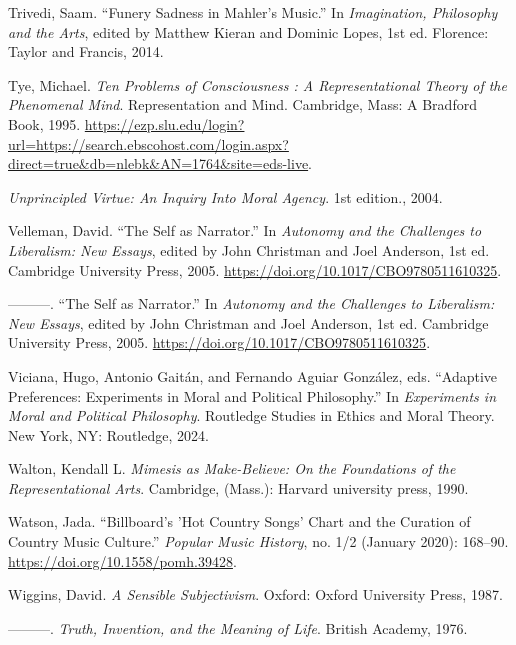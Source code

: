 \documentclass[
  12pt,
]{book}
\newlength{\cslhangindent}
\newenvironment{CSLReferences}[2] %
 {\begin{list}{}{%
  \setlength{\itemindent}{0pt}
  \setlength{\leftmargin}{0pt}
  \setlength{\parsep}{0pt}
  \ifodd #1
   \setlength{\leftmargin}{\cslhangindent}
   \setlength{\itemindent}{-1\cslhangindent}
  \fi
  \setlength{\itemsep}{#2\baselineskip}}}
 {\end{list}}
\theoremstyle{definition}
\theoremstyle{definition}
\theoremstyle{definition}
\theoremstyle{definition}
\theoremstyle{remark}
\begin{document}
\begin{CSLReferences}{1}{0}
Trivedi, Saam. {``Funery {Sadness} in {Mahler}'s {Music}.''} In \emph{Imagination, {Philosophy} and the {Arts}}, edited by Matthew Kieran and Dominic Lopes, 1st ed. Florence: {Taylor and Francis}, 2014.

Tye, Michael. \emph{Ten {Problems} of {Consciousness} : {A Representational Theory} of the {Phenomenal Mind}}. Representation and {Mind}. Cambridge, Mass: A Bradford Book, 1995. \url{https://ezp.slu.edu/login?url=https://search.ebscohost.com/login.aspx?direct=true&db=nlebk&AN=1764&site=eds-live}.

\emph{Unprincipled {Virtue}: {An Inquiry Into Moral Agency}}. 1st edition., 2004.

Velleman, David. {``The {Self} as {Narrator}.''} In \emph{Autonomy and the {Challenges} to {Liberalism}: {New Essays}}, edited by John Christman and Joel Anderson, 1st ed. Cambridge University Press, 2005. \url{https://doi.org/10.1017/CBO9780511610325}.

---------. {``The {Self} as {Narrator}.''} In \emph{Autonomy and the {Challenges} to {Liberalism}: {New Essays}}, edited by John Christman and Joel Anderson, 1st ed. Cambridge University Press, 2005. \url{https://doi.org/10.1017/CBO9780511610325}.

Viciana, Hugo, Antonio Gaitán, and Fernando Aguiar González, eds. {``Adaptive {Preferences}: {Experiments} in {Moral} and {Political Philosophy}.''} In \emph{Experiments in Moral and Political Philosophy}. Routledge Studies in Ethics and Moral Theory. New York, NY: Routledge, 2024.

Walton, Kendall L. \emph{Mimesis as {Make-Believe}: {On} the {Foundations} of the {Representational Arts}}. Cambridge, (Mass.): Harvard university press, 1990.

Watson, Jada. {``Billboard's '{Hot Country Songs}' Chart and the Curation of Country Music Culture.''} \emph{Popular Music History}, no. 1/2 (January 2020): 168--90. \url{https://doi.org/10.1558/pomh.39428}.

Wiggins, David. \emph{A Sensible Subjectivism}. Oxford: Oxford University Press, 1987.

---------. \emph{Truth, {Invention}, and the {Meaning} of {Life}}. British Academy, 1976.


\end{CSLReferences}
\end{document}
